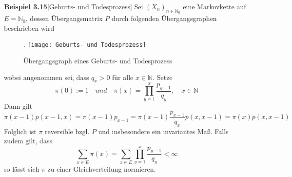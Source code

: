 \textbf{Beispiel 3.15}[Geburts- und Todesprozess]
Sei $(X_{n})_{n \in \mathbb{N}_{0}}$ eine Markovkette auf $E = \mathbb{N}_{0}$, dessen Übergangsmatrix $P$ durch folgenden Übergangsgraphen beschrieben wird
\begin{figure}[H].
\centering
\texttt{[image: Geburts- und Todesprozess]}
\caption{Übergangsgraph eines Geburts- und Todesprozess}
\end{figure}
\noindent
wobei angenommen sei, dass $q_{x} > 0$ für alle $x \in \mathbb{N}$. Setze
\begin{equation*}
\pi(0) := 1 \quad und \quad \pi(x) = \prod_{y=1}^{x} \dfrac{p_{y-1}}{q_{y}}, \quad x \in \mathbb{N}
\end{equation*} 
Dann gilt
\begin{equation*}
\pi(x-1)p(x-1,x) = \pi(x-1)p_{x-1} = \pi(x-1) \dfrac{p_{x-1}}{q_{x}}p(x,x-1) = \pi(x)p(x,x-1)
\end{equation*}
Folglich ist $\pi$ reversible bzgl. $P$ und insbesondere ein invariantes Maß. Falls zudem gilt, dass
\begin{equation*}
\sum_{x \in E} \pi(x) = \sum_{x \in E} \prod_{y=1}^{x} \dfrac{p_{y-1}}{q_{y}} < \infty
\end{equation*}
so lässt sich $\pi$ zu einer Gleichverteilung normieren.

